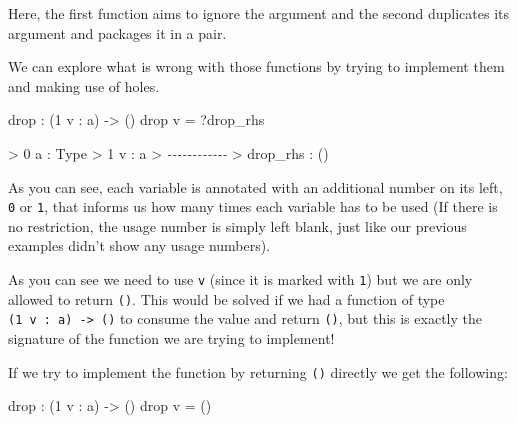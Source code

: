 \documentclass[
]{article}
\newenvironment{Shaded}{}{}
\newcommand{\CommentTok}[1]{\textcolor[rgb]{0.38,0.63,0.69}{\textit{#1}}}
\newcommand{\DataTypeTok}[1]{\textcolor[rgb]{0.56,0.13,0.00}{#1}}
\newcommand{\DecValTok}[1]{\textcolor[rgb]{0.25,0.63,0.44}{#1}}
\newcommand{\FunctionTok}[1]{\textcolor[rgb]{0.02,0.16,0.49}{#1}}
\newcommand{\NormalTok}[1]{#1}
\newcommand{\OperatorTok}[1]{\textcolor[rgb]{0.40,0.40,0.40}{#1}}
\newcommand{\OtherTok}[1]{\textcolor[rgb]{0.00,0.44,0.13}{#1}}
\begin{document}
Here, the first function aims to ignore the argument and the second
duplicates its argument and packages it in a pair.

We can explore what is wrong with those functions by trying to implement
them and making use of holes.

\begin{Shaded}
\begin{Highlighting}[]
\FunctionTok{drop} \OperatorTok{:}\NormalTok{ (}\DecValTok{1}\NormalTok{ v }\OperatorTok{:}\NormalTok{ a) }\OtherTok{{-}\textgreater{}}\NormalTok{ ()}
\FunctionTok{drop}\NormalTok{ v }\OtherTok{=} \OperatorTok{?}\NormalTok{drop\_rhs}
\end{Highlighting}
\end{Shaded}

\begin{Shaded}
\begin{Highlighting}[]
\OperatorTok{\textgreater{}} \DecValTok{0}\NormalTok{ a }\OperatorTok{:} \DataTypeTok{Type}
\OperatorTok{\textgreater{}} \DecValTok{1}\NormalTok{ v }\OperatorTok{:}\NormalTok{ a}
\OperatorTok{\textgreater{}} \CommentTok{{-}{-}{-}{-}{-}{-}{-}{-}{-}{-}{-}{-}}
\OperatorTok{\textgreater{}}\NormalTok{ drop\_rhs }\OperatorTok{:}\NormalTok{ ()}
\end{Highlighting}
\end{Shaded}

As you can see, each variable is annotated with an additional number on
its left, \texttt{0} or \texttt{1}, that informs us how many times each
variable has to be used (If there is no restriction, the usage number is
simply left blank, just like our previous examples didn't show any usage
numbers).

As you can see we need to use \texttt{v} (since it is marked with
\texttt{1}) but we are only allowed to return \texttt{()}. This would be
solved if we had a function of type
\texttt{(1\ v\ :\ a)\ -\textgreater{}\ ()} to consume the value and
return \texttt{()}, but this is exactly the signature of the function we
are trying to implement!

If we try to implement the function by returning \texttt{()} directly we
get the following:

\begin{Shaded}
\begin{Highlighting}[]
\FunctionTok{drop} \OperatorTok{:}\NormalTok{ (}\DecValTok{1}\NormalTok{ v }\OperatorTok{:}\NormalTok{ a) }\OtherTok{{-}\textgreater{}}\NormalTok{ ()}
\FunctionTok{drop}\NormalTok{ v }\OtherTok{=}\NormalTok{ ()}
\end{Highlighting}
\end{Shaded}
\end{document}
